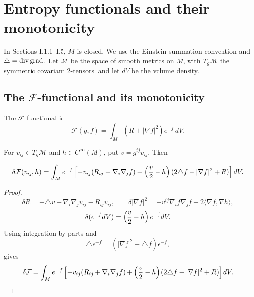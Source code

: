 \section{Entropy functionals and their monotonicity}

In Sections I.1.1--I.5, $M$ is closed. We use the Einstein summation
convention and $\triangle=\operatorname{div}\operatorname{grad}$. Let ${\mathcal M}$ be the space of
smooth metrics on $M$, with $T_g{\mathcal M}$ the symmetric covariant
$2$-tensors, and let $dV$ be the volume density.

\subsection{The ${\mathcal F}$-functional and its monotonicity} \label{I.1.1}
\label{Derivation of first equation of Section 1.1}

\begin{definition}
  \label{def:kl-f-entropy-f-entropy-definition}
The ${\mathcal F}$-functional is
\begin{equation}
{\mathcal F}(g,f)=\int_M(R+|\nabla f|^2)e^{-f}\,dV.
\end{equation}
\end{definition}

For $v_{ij}\in T_g{\mathcal M}$ and $h\in C^\infty(M)$, put
$v=g^{ij}v_{ij}$. Then
\begin{proposition}
  \label{prop:kl-f-entropy-first-variation-f-entropy}
\begin{equation}
\delta {\mathcal F}(v_{ij},h)=\int_Me^{-f}\left[-v_{ij}(R_{ij}+\nabla_i\nabla_jf)
+\left({v\over2}-h\right)(2\triangle f-|\nabla f|^2+R)\right]dV.
\end{equation}
\end{proposition}
\begin{proof}
\sketch
\begin{equation}
\delta R=-\triangle v+\nabla_i\nabla_jv_{ij}-R_{ij}v_{ij},\qquad
\delta|\nabla f|^2=-v^{ij}\nabla_if\nabla_jf+2\langle\nabla f,\nabla h\rangle,
\end{equation}
\begin{equation}\label{measvar}
\delta(e^{-f}dV)=\left({v\over2}-h\right)e^{-f}dV.
\end{equation}
Using integration by parts and
\begin{equation}\label{id}
\triangle e^{-f}=(|\nabla f|^2-\triangle f)e^{-f},
\end{equation}
gives
\begin{equation}\label{Fvariation}
\delta {\mathcal F}=\int_Me^{-f}\left[-v_{ij}(R_{ij}+\nabla_i\nabla_jf)
+\left({v\over2}-h\right)(2\triangle f-|\nabla f|^2+R)\right]dV.
\end{equation}
\end{proof}

